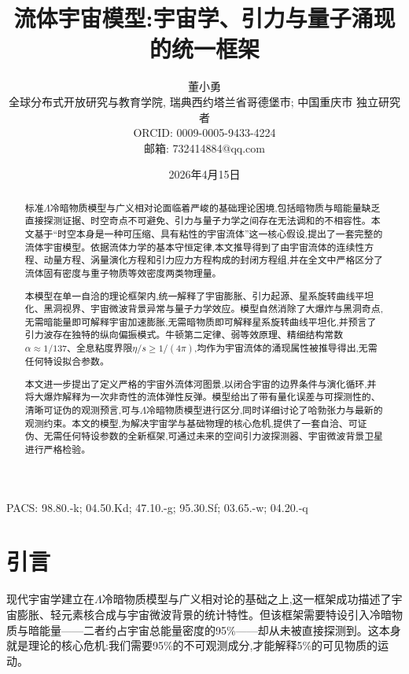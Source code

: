 \documentclass[11pt,a4paper]{article}
\title{流体宇宙模型:宇宙学、引力与量子涌现的统一框架}
\author{
董小勇\\
全球分布式开放研究与教育学院, 瑞典西约塔兰省哥德堡市; 中国重庆市 独立研究者\\
ORCID: 0009-0005-9433-4224\\
邮箱: 732414884@qq.com
}
\date{2026年4月15日}
\begin{document}
\maketitle


\begin{center}
PACS: 98.80.-k; 04.50.Kd; 47.10.-g; 95.30.Sf; 03.65.-w; 04.20.-q
\end{center}

\begin{abstract}
标准$\Lambda$冷暗物质模型与广义相对论面临着严峻的基础理论困境,包括暗物质与暗能量缺乏直接探测证据、时空奇点不可避免、引力与量子力学之间存在无法调和的不相容性。本文基于``时空本身是一种可压缩、具有粘性的宇宙流体''这一核心假设,提出了一套完整的流体宇宙模型。依据流体力学的基本守恒定律,本文推导得到了由宇宙流体的连续性方程、动量方程、涡量演化方程和引力应力方程构成的封闭方程组,并在全文中严格区分了流体固有密度与重子物质等效密度两类物理量。

本模型在单一自洽的理论框架内,统一解释了宇宙膨胀、引力起源、星系旋转曲线平坦化、黑洞视界、宇宙微波背景异常与量子力学效应。模型自然消除了大爆炸与黑洞奇点,无需暗能量即可解释宇宙加速膨胀,无需暗物质即可解释星系旋转曲线平坦化,并预言了引力波存在独特的纵向偏振模式。牛顿第二定律、弱等效原理、精细结构常数$\alpha\approx1/137$、全息粘度界限$\eta/s\geq1/(4\pi)$,均作为宇宙流体的涌现属性被推导得出,无需任何特设拟合参数。

本文进一步提出了定义严格的宇宙外流体河图景,以闭合宇宙的边界条件与演化循环,并将大爆炸解释为一次非奇性的流体弹性反弹。模型给出了带有量化误差与可探测性的、清晰可证伪的观测预言,可与$\Lambda$冷暗物质模型进行区分,同时详细讨论了哈勃张力与最新的观测约束。本文的模型,为解决宇宙学与基础物理的核心危机,提供了一套自洽、可证伪、无需任何特设参数的全新框架,可通过未来的空间引力波探测器、宇宙微波背景卫星进行严格检验。
\end{abstract}


\section{引言}
现代宇宙学建立在$\Lambda$冷暗物质模型与广义相对论的基础之上,这一框架成功描述了宇宙膨胀、轻元素核合成与宇宙微波背景的统计特性。但该框架需要特设引入冷暗物质与暗能量——二者约占宇宙总能量密度的95\%——却从未被直接探测到。这本身就是理论的核心危机:我们需要95\%的不可观测成分,才能解释5\%的可见物质的运动。
\end{document}
